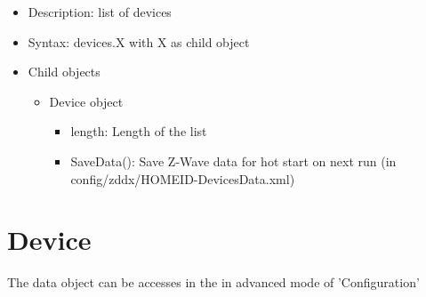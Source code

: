\begin {itemize}
\item Description: list of devices
\item Syntax:  devices.X with X as child object
\item Child objects
\begin {itemize}
\item Device object
\begin {itemize}
\item length: Length of the list
\item SaveData(): Save \zway Z-Wave data for hot start on next run (in config/zddx/HOMEID-DevicesData.xml)
\end {itemize}
\end {itemize}
\end {itemize}
 

\section{Device}

The data object can be accesses in the \zweui in advanced mode of 'Configuration'

